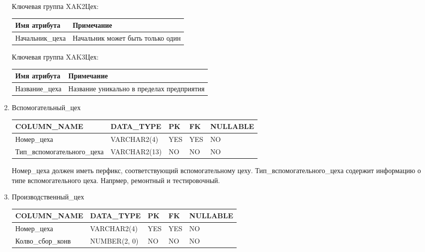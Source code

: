\begin{enumerate}
    Ключевая группа XAK2Цех:

    \begin{tabular}{|p{7cm}|p{9.3cm}|} \hline

        {\bf Имя атрибута} & {\bf Примечание} \\ \hline
        Начальник\_цеха & Начальник может быть только один \\ \hline

    \end{tabular}

    Ключевая группа XAK3Цех:

    \begin{tabular}{|p{7cm}|p{9.3cm}|} \hline

        {\bf Имя атрибута} & {\bf Примечание} \\ \hline
        Название\_цеха & Название уникально в пределах предприятия \\ \hline

    \end{tabular}

    \item{Вспомогательный\_цех}

    \begin{tabular}{|p{7cm}|p{3cm}|p{1cm}|p{1cm}|p{3cm}|} \hline

        {\bf COLUMN\_NAME} & {\bf DATA\_TYPE} & {\bf PK} & {\bf FK} & {\bf NULLABLE} \\ \hline
        Номер\_цеха & VARCHAR2(4) & YES & YES & NO \\ \hline
        Тип\_вспомогательного\_цеха & VARCHAR2(13) & NO & NO & NO \\ \hline

    \end{tabular}

    Номер\_цеха должен иметь перфикс, соответствующий вспомогательному цеху.
    Тип\_вспомогательного\_цеха содержит информацию о типе вспомогательного цеха.
    Напрмер, ремонтный и тестировочный.

    \item{Производственный\_цех}

    \begin{tabular}{|p{7cm}|p{3cm}|p{1cm}|p{1cm}|p{3cm}|} \hline

        {\bf COLUMN\_NAME} & {\bf DATA\_TYPE} & {\bf PK} & {\bf FK} & {\bf NULLABLE} \\ \hline
        Номер\_цеха & VARCHAR2(4) & YES & YES & NO \\ \hline
        Колво\_сбор\_конв & NUMBER(2, 0) & NO & NO & NO \\ \hline


\end{tabular}
\end{enumerate}
